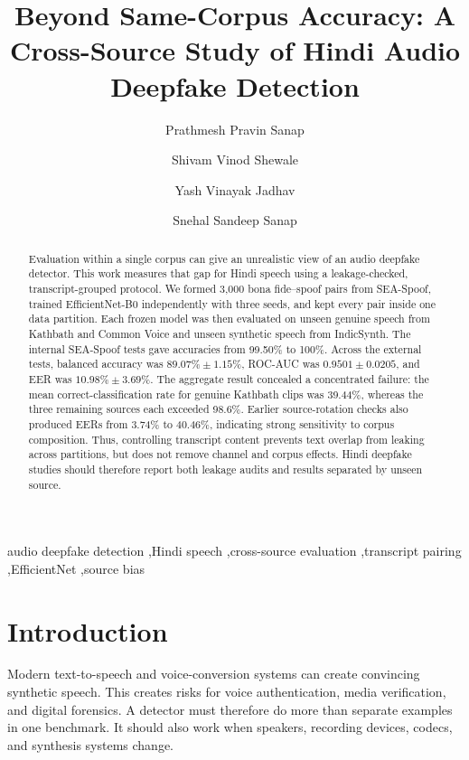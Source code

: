 \documentclass[3p,times,procedia]{elsarticle}
\begin{document}
\begin{frontmatter}


\title{Beyond Same-Corpus Accuracy: A Cross-Source Study of Hindi Audio Deepfake Detection}

\author[kkw]{Prathmesh Pravin Sanap}
\author[kkw]{Shivam Vinod Shewale}
\author[kkw]{Yash Vinayak Jadhav}
\author[kkw]{Snehal Sandeep Sanap}

\address[kkw]{Department of Computer Engineering, K. K. Wagh Institute of Engineering Education and Research, Nashik 422003, Maharashtra, India}

\begin{abstract}
Evaluation within a single corpus can give an unrealistic view of an audio
deepfake detector. This work measures that gap for Hindi speech using a
leakage-checked, transcript-grouped protocol. We formed 3,000 bona
fide--spoof pairs from SEA-Spoof, trained EfficientNet-B0 independently with
three seeds, and kept every pair inside one data partition. Each frozen model
was then evaluated on unseen genuine speech from Kathbath and Common Voice
and unseen synthetic speech from IndicSynth. The internal SEA-Spoof tests
gave accuracies from 99.50\% to 100\%. Across the external tests, balanced
accuracy was $89.07\%\pm1.15\%$, ROC-AUC was $0.9501\pm0.0205$, and EER was
$10.98\%\pm3.69\%$. The aggregate result concealed a concentrated failure:
the mean correct-classification rate for genuine Kathbath clips was 39.44\%,
whereas the three remaining sources each exceeded 98.6\%. Earlier
source-rotation checks also produced EERs from 3.74\% to 40.46\%, indicating
strong sensitivity to corpus composition. Thus, controlling transcript
content prevents text overlap from leaking across partitions, but does not
remove channel and corpus effects. Hindi deepfake studies should therefore
report both leakage audits and results separated by unseen source.
\end{abstract}

\begin{keyword}
audio deepfake detection \sep Hindi speech \sep cross-source evaluation
\sep transcript pairing \sep EfficientNet \sep source bias
\end{keyword}

\end{frontmatter}
\vspace*{-6pt}

\section{Introduction}
Modern text-to-speech and voice-conversion systems can create convincing
synthetic speech. This creates risks for voice authentication, media
verification, and digital forensics. A detector must therefore do more than
separate examples in one benchmark. It should also work when speakers,
recording devices, codecs, and synthesis systems change.
\end{document}
